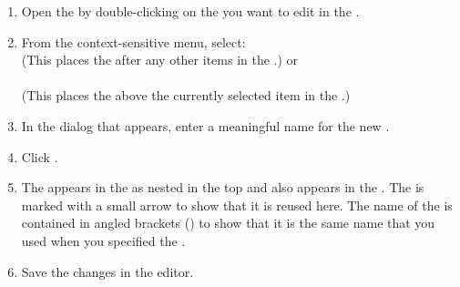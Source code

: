 \begin{enumerate}
\item Open the \gdtestcaseeditor{} by double-clicking on the \gdcase{} you want to edit in the \gdtestcasebrowser{}. 
\item From the context-sensitive menu, select:
\\
(This places the \gdcase{} after any other items in the \gdtestcaseeditor{}.)
or\\
\\
(This places the \gdcase{} above the currently selected item in the \gdtestcaseeditor{}.)

\item In the dialog that appears, enter a meaningful name for the new \gdcase{}. 
\item Click . 
\item The \gdcase{} appears in the \gdtestcaseeditor{} as nested in the top \gdcase{} and also appears in the \gdtestcasebrowser{}.  The \gdcase{} is  marked with a small arrow to show that it is  reused here. The name of the \gdcase{} is contained in angled brackets (\bxshell{< >}) to show that it is the same name that you used when you specified the \gdcase{}. 
\item Save the changes in the editor.
\end{enumerate}
